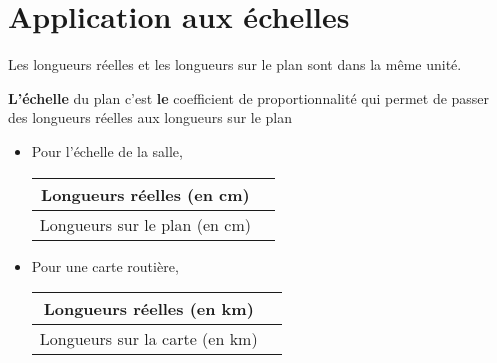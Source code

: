 \section{Application aux échelles}
\begin{definition}
   Les longueurs réelles et les longueurs sur le plan sont dans la même unité.

   \textbf{L'échelle} du plan c'est \textbf{le} coefficient de proportionnalité qui permet de passer des longueurs réelles aux longueurs sur le plan
\end{definition}

\begin{exemple*1}
   \begin{itemize}
      \item Pour l'échelle de la salle,
      \begin{tabular}{|c|c|}
      \hline
      Longueurs réelles (en cm)&\\
      \hline
      Longueurs sur le plan (en cm)&\\
      \hline
      \end{tabular}
      \par\vspace{0.25cm}
      \item Pour une carte routière,
      \begin{tabular}{|c|c|}
      \hline
      Longueurs réelles (en km)&\\
      \hline
      Longueurs sur la carte (en km)&\\
      \hline
      \end{tabular}
   \end{itemize}
\end{exemple*1}
